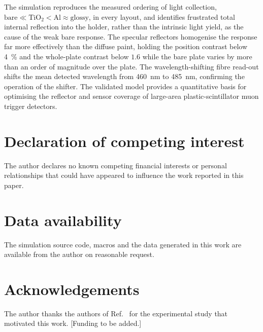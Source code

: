 \documentclass[3p]{elsarticle}
\begin{document}
The simulation reproduces the measured ordering of light collection,
$\text{bare} \ll \text{TiO}_2 < \text{Al} \approx \text{glossy}$, in every layout,
and identifies frustrated total internal reflection into the holder, rather than
the intrinsic light yield, as the cause of the weak bare response. The
specular reflectors homogenise the response far more effectively than the
diffuse paint, holding the position contrast below \SI{4}{\percent} and the
whole-plate contrast below $1.6$ while the bare plate varies by more than an
order of magnitude over the plate. The wavelength-shifting fibre read-out shifts
the mean detected wavelength from \SI{460}{\nano\meter} to \SI{485}{\nano\meter},
confirming the operation of the shifter. The validated model provides a
quantitative basis for optimising the reflector and sensor coverage of
large-area plastic-scintillator muon trigger detectors.

\section*{Declaration of competing interest}
The author declares no known competing financial interests or personal
relationships that could have appeared to influence the work reported in this
paper.

\section*{Data availability}
The simulation source code, macros and the data generated in this work are
available from the author on reasonable request.

\section*{Acknowledgements}
The author thanks the authors of Ref.~\cite{Rao2025} for the experimental study
that motivated this work. [Funding to be added.]



\end{document}
